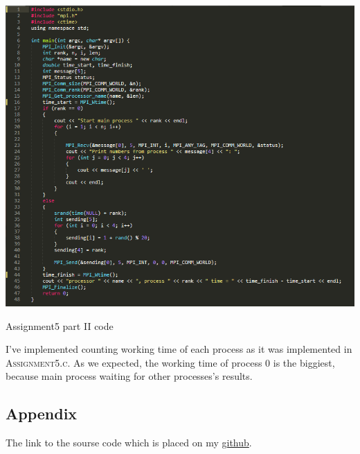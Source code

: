 \documentclass[%
12pt, %
final, %
oneside, %
onecolumn, %
centertags]{article} %
\theoremstyle{plain}
\theoremstyle{definition}
\theoremstyle{remark}
\begin{document}
\begin{center}
\includegraphics[scale=0.7]{5.2.code.png}

Assignment5 part II code
\end{center}

I've implemented counting working time of each process as it was implemented in \textsc{Assignment5.c}. As we expected, the working time of process $0$ is the biggiest, because main process waiting for other processes's results.



\subsection{Appendix}

The link to the sourse code which is placed on my \href{https://github.com/aptmess/parallel_algorithms}{github}.
\end{document}
